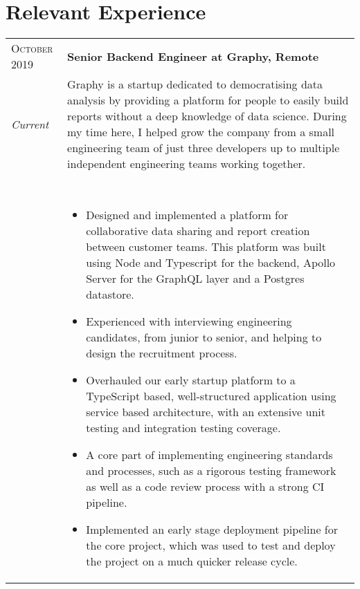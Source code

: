 

\section{Relevant Experience}\label{sec:relevant-experience}

\begin{tabular}{p{60pt}|p{11cm}}
    \hspace*{\fill}\textsc{October 2019} & \textbf{Senior Backend Engineer at Graphy, Remote} \\

    \hspace*{\fill}\emph{Current}& \small{
        Graphy is a startup dedicated to democratising data analysis by providing a platform for people to easily build reports without a deep knowledge of data science.
        During my time here, I helped grow the company from a small engineering team of just three developers up to multiple independent engineering teams working together.
    } \\
    \ & \vspace{1pt} \\
    \hspace*{\fill}       & \vspace{-0.9em}
    \begin{itemize}[itemsep=0pt,topsep=0pt,leftmargin=*]
        \small
        \item Designed and implemented a platform for collaborative data sharing and report creation between customer teams.
        This platform was built using Node and Typescript for the backend, Apollo Server for the GraphQL layer and a Postgres datastore.
        \item Experienced with interviewing engineering candidates, from junior to senior, and helping to design the recruitment process.
        \item Overhauled our early startup platform to a TypeScript based, well-structured application using service based architecture, with an extensive unit testing and integration testing coverage.
        \item A core part of implementing engineering standards and processes, such as a rigorous testing framework as well as a code review process with a strong CI pipeline.
        \item Implemented an early stage deployment pipeline for the core project, which was used to test and deploy the project on a much quicker release cycle.
    \end{itemize}
\end{tabular} \\ \\ \\


